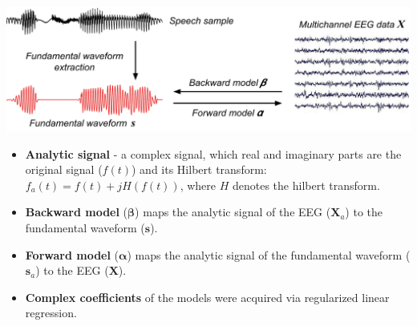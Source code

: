 \documentclass[a0,landscape]{a0poster}
\newenvironment{nitemize}{%
  \begin{itemize}[topsep=6pt,itemsep=2pt,parsep=0pt]%
}{%
  \end{itemize}%
}
\newenvironment{Figure}
  {\par\medskip\noindent\minipage{\linewidth}}
  {\endminipage\par\medskip}
\begin{document}
\begin{multicols*}{3}
\begin{Figure}
\centering
\includegraphics[width=\textwidth,keepaspectratio]{ComplexModel.pdf}
\end{Figure}
\begin{nitemize}
\item \textbf{Analytic signal} - a complex signal, which real and imaginary parts are the original signal ($f(t)$) and its Hilbert transform: $f_{a}(t) = f(t) + jH(f(t))$, where $H$ denotes the hilbert transform.
\item \textbf{Backward model} ($\boldsymbol{\beta}$) maps the analytic signal of the EEG ({$\boldsymbol{X}_{a}$}) to the fundamental waveform ($\boldsymbol{s}$).
\item \textbf{Forward model} ($\boldsymbol{\alpha}$) maps the analytic signal of the fundamental waveform ({$\boldsymbol{s}_{a}$}) to the EEG ($\boldsymbol{X}$).
\item \textbf{Complex coefficients} of the models were acquired via regularized linear regression.
\end{nitemize}


\end{multicols*}
\end{document}
